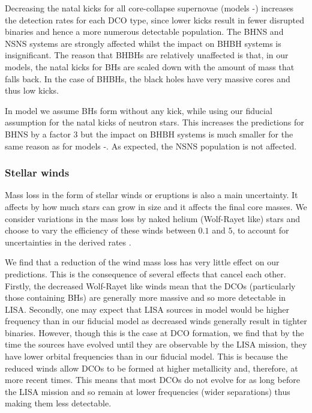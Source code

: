 Decreasing the natal kicks for all core-collapse supernovae (models \modSigLow{}-\modSigLower{}) increases the detection rates for each DCO type, since lower kicks result in fewer disrupted binaries and hence a more numerous detectable population. The BHNS and NSNS systems are strongly affected whilst the impact on BHBH systems is insignificant. The reason that BHBHs are relatively unaffected is that, in our models, the natal kicks for BHs are scaled down with the amount of mass that falls back. In the case of BHBHs, the black holes have very massive cores and thus low kicks.

In model \modNoBH{} we assume BHs form without any kick, while using our fiducial assumption for the natal kicks of neutron stars. This increases the predictions for BHNS by a factor 3 but the impact on BHBH systems is much smaller for the same reason as for models \modSigLow{}-\modSigLower{}. As expected, the NSNS population is not affected. 

\subsubsection{Stellar winds}
Mass loss in the form of stellar winds or eruptions is also a main uncertainty. It affects by how much stars can grow in size and it affects the final core masses. We consider variations in the mass loss by naked helium (Wolf-Rayet like) stars and choose to vary the efficiency of these winds between $0.1$ and $5$, to account for uncertainties in the derived rates \citep[e.g.][]{Vink+2017, Shenar+2019, Hamann+2019, Sander+2020}.

We find that a reduction of the wind mass loss has very little effect on our predictions. This is the consequence of several effects that cancel each other. Firstly, the decreased Wolf-Rayet like winds mean that the DCOs (particularly those containing BHs) are generally more massive and so more detectable in LISA. Secondly, one may expect that LISA sources in model \modWRLow{} would be higher frequency than in our fiducial model as decreased winds generally result in tighter binaries. However, though this is the case at DCO formation, we find that by the time the sources have evolved until they are observable by the LISA mission, they have lower orbital frequencies than in our fiducial model. This is because the reduced winds allow DCOs to be formed at higher metallicity and, therefore, at more recent times. This means that most DCOs do not evolve for as long before the LISA mission and so remain at lower frequencies (wider separations) thus making them less detectable.


